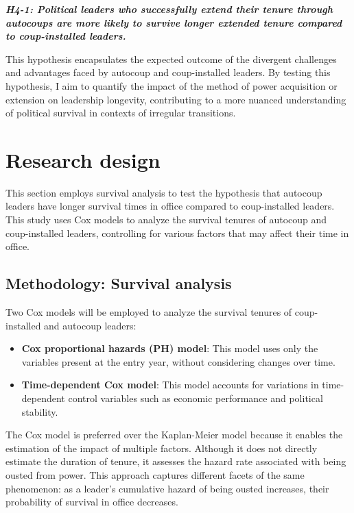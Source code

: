 \documentclass[
  12pt,
]{report}
\begin{document}
\textbf{\emph{H4-1: Political leaders who successfully extend their
tenure through autocoups are more likely to survive longer extended
tenure compared to coup-installed leaders.}}

This hypothesis encapsulates the expected outcome of the divergent
challenges and advantages faced by autocoup and coup-installed leaders.
By testing this hypothesis, I aim to quantify the impact of the method
of power acquisition or extension on leadership longevity, contributing
to a more nuanced understanding of political survival in contexts of
irregular transitions.

\section{Research design}\label{research-design-1}

This section employs survival analysis to test the hypothesis that
autocoup leaders have longer survival times in office compared to
coup-installed leaders. This study uses Cox models to analyze the
survival tenures of autocoup and coup-installed leaders, controlling for
various factors that may affect their time in office.

\subsection{Methodology: Survival
analysis}\label{methodology-survival-analysis}

Two Cox models will be employed to analyze the survival tenures of
coup-installed and autocoup leaders:

\begin{itemize}
\item
  \textbf{Cox proportional hazards (PH) model}: This model uses only the
  variables present at the entry year, without considering changes over
  time.
\item
  \textbf{Time-dependent Cox model}: This model accounts for variations
  in time-dependent control variables such as economic performance and
  political stability.
\end{itemize}

The Cox model is preferred over the Kaplan-Meier model because it
enables the estimation of the impact of multiple factors. Although it
does not directly estimate the duration of tenure, it assesses the
hazard rate associated with being ousted from power. This approach
captures different facets of the same phenomenon: as a leader's
cumulative hazard of being ousted increases, their probability of
survival in office decreases.
\end{document}
